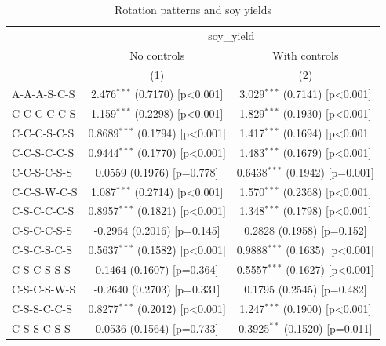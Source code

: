 
\begin{table}[H]
   \caption{\label{tab:soy_rot} Rotation patterns and soy yields}
   \bigskip
   \centering
   \scriptsize
   \renewcommand*{\arraystretch}{0.8}
   \begin{tabular}{lcc}
      \toprule
       & \multicolumn{2}{c}{soy\_yield}\\
                                      & No controls             & With controls \\   
                                      & (1)                     & (2)\\  
      \midrule 
      A-A-A-S-C-S                     & 2.476$^{***}$ (0.7170) [p<0.001]  & 3.029$^{***}$ (0.7141) [p<0.001]\\   
      C-C-C-C-C-S                     & 1.159$^{***}$ (0.2298) [p<0.001]  & 1.829$^{***}$ (0.1930) [p<0.001]\\   
      C-C-C-S-C-S                     & 0.8689$^{***}$ (0.1794) [p<0.001] & 1.417$^{***}$ (0.1694) [p<0.001]\\   
      C-C-S-C-C-S                     & 0.9444$^{***}$ (0.1770) [p<0.001] & 1.483$^{***}$ (0.1679) [p<0.001]\\   
      C-C-S-C-S-S                     & 0.0559 (0.1976) [p=0.778]         & 0.6438$^{***}$ (0.1942) [p=0.001]\\   
      C-C-S-W-C-S                     & 1.087$^{***}$ (0.2714) [p<0.001]  & 1.570$^{***}$ (0.2368) [p<0.001]\\   
      C-S-C-C-C-S                     & 0.8957$^{***}$ (0.1821) [p<0.001] & 1.348$^{***}$ (0.1798) [p<0.001]\\   
      C-S-C-C-S-S                     & -0.2964 (0.2016) [p=0.145]        & 0.2828 (0.1958) [p=0.152]\\   
      C-S-C-S-C-S                     & 0.5637$^{***}$ (0.1582) [p<0.001] & 0.9888$^{***}$ (0.1635) [p<0.001]\\   
      C-S-C-S-S-S                     & 0.1464 (0.1607) [p=0.364]         & 0.5557$^{***}$ (0.1627) [p<0.001]\\   
      C-S-C-S-W-S                     & -0.2640 (0.2703) [p=0.331]        & 0.1795 (0.2545) [p=0.482]\\   
      C-S-S-C-C-S                     & 0.8277$^{***}$ (0.2012) [p<0.001] & 1.247$^{***}$ (0.1900) [p<0.001]\\   
      C-S-S-C-S-S                     & 0.0536 (0.1564) [p=0.733]         & 0.3925$^{**}$ (0.1520) [p=0.011]\\   

\end{tabular}
\end{table}
